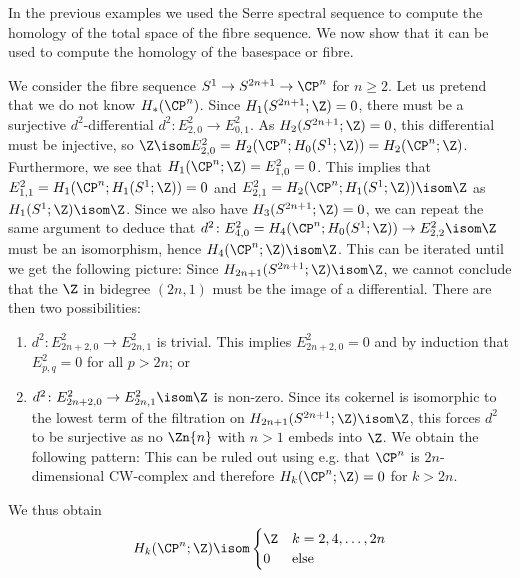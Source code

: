 \documentclass[wip, topology]{bsteffan-lecturenotes}
\begin{document}
In the previous examples we used the Serre spectral sequence to compute the homology of the total space of the fibre sequence.
We now show that it can be used to compute the homology of the basespace or fibre.
\begin{example}
	We consider the fibre sequence $S^1 \to S^{2n + 1} \to \CP^n$ for $n \geq 2$.
	Let us pretend that we do not know $H_*(\CP^n)$.
	Since $H_1(S^{2n + 1}; \Z) = 0$, there must be a surjective $d^2$-differential $d^2\colon E^2_{2, 0} \to E^2_{0, 1}$.
	As $H_2(S^{2n + 1}; \Z) = 0$, this differential must be injective, so $\Z \isom E^2_{2, 0} = H_2(\CP^n; H_0(S^1; \Z)) = H_2(\CP^n; \Z)$.
	Furthermore, we see that $H_1(\CP^n; \Z) = E^2_{1, 0} = 0$.
	This implies that $E^2_{1, 1} = H_1(\CP^n; H_1(S^1; \Z)) = 0$ and $E^2_{2, 1} = H_2(\CP^n; H_1(S^1; \Z)) \isom \Z$ as $H_1(S^1; \Z) \isom \Z$.
	Since we also have $H_3(S^{2n + 1}; \Z) = 0$, we can repeat the same argument to deduce that $d^2\colon E^2_{4, 0} = H_4(\CP^n; H_0(S^1; \Z)) \to E^2_{2, 2} \isom \Z$ must be an isomorphism, hence $H_4(\CP^n; \Z) \isom \Z$.
	This can be iterated until we get the following picture: %
	Since $H_{2n + 1}(S^{2n + 1}; \Z) \isom \Z$, we cannot conclude that the $\Z$ in bidegree $(2n, 1)$ must be the image of a differential.
	There are then two possibilities:
	\begin{enumerate}
		\item $d^2\colon E^2_{2n + 2, 0} \to E^2_{2n, 1}$ is trivial.
			This implies $E^2_{2n + 2, 0} = 0$ and by induction that $E^2_{p, q} = 0$ for all $p > 2n$; or
		\item $d^2\colon E^2_{2n + 2, 0} \to E^2_{2n, 1} \isom \Z$ is non-zero.
			Since its cokernel is isomorphic to the lowest term of the filtration on $H_{2n + 1}(S^{2n + 1}; \Z) \isom \Z$, this forces $d^2$ to be surjective as no $\Zn{n}$ with $n > 1$ embeds into $\Z$.
			We obtain the following pattern: %
			This can be ruled out using e.g. that $\CP^n$ is $2n$-dimensional CW-complex and therefore $H_k(\CP^n; \Z) = 0$ for $k > 2n$.
	\end{enumerate}
	We thus obtain 
	\begin{equation*}
		H_k(\CP^n; \Z) \isom \begin{cases}
			\Z & k = 2, 4, \ldots, 2n \\
			0  & \text{else}
		\end{cases}
	\end{equation*}
\end{example}
\end{document}
